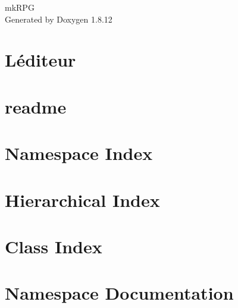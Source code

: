 \documentclass[twoside]{book}
\newcommand{\+}{\discretionary{\mbox{\scriptsize$\hookleftarrow$}}{}{}}
\newcommand{\clearemptydoublepage}{%
  \newpage{\pagestyle{empty}\cleardoublepage}%
}
\begin{document}
\hypersetup{pageanchor=false,
             bookmarksnumbered=true,
             pdfencoding=unicode
            }
\begin{titlepage}
\vspace*{7cm}
\begin{center}%
{\Large mk\+R\+PG }\\
\vspace*{1cm}
{\large Generated by Doxygen 1.8.12}\\
\end{center}
\end{titlepage}
\clearemptydoublepage
{}
\tableofcontents
\clearemptydoublepage
{}
\hypersetup{pageanchor=true}

\chapter{L\textquotesingle{}éditeur}
\label{md_src_editor__r_e_a_d_m_e}
\hypertarget{md_src_editor__r_e_a_d_m_e}{}

\chapter{readme}
\label{md_src_readme}
\hypertarget{md_src_readme}{}

\chapter{Namespace Index}

\chapter{Hierarchical Index}

\chapter{Class Index}

\chapter{Namespace Documentation}

\end{document}
